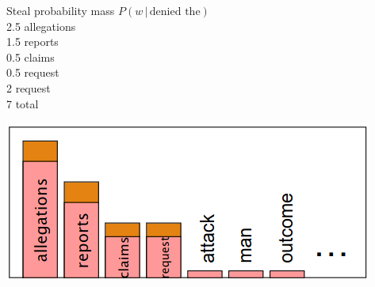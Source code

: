 \documentclass[13.5pt,aspecratio=169]{beamer}
\begin{document}
\begin{frame}
    \begin{minipage}{0.45\textwidth}  %
        \begin{block}{Steal probability mass} %
            \hspace{30pt} $P(w \hspace{2pt} | \hspace{2pt} \text{denied the})$ \\
            \hspace{35pt} 2.5 allegations \\
            \hspace{35pt} 1.5 reports \\
            \hspace{35pt} 0.5 claims \\
            \hspace{35pt} 0.5 request \\
            \hspace{35pt} 2 request \\
            \hspace{35pt} 7 total
        \end{block}
    \end{minipage}\hspace{10pt}
    \begin{minipage}{0.45\textwidth}  %
            \centering
            \includegraphics[scale=0.5]{steal_probability_mass.png}
    \end{minipage}
	

\end{frame}


\end{document}
